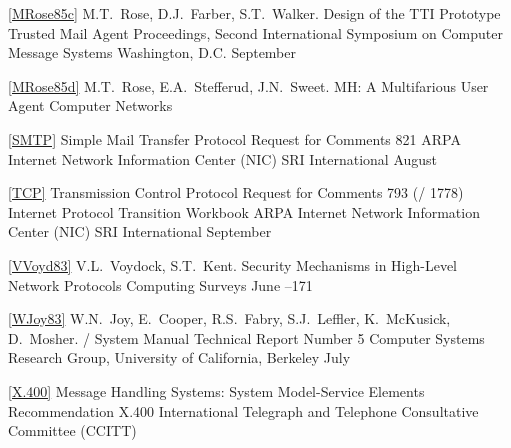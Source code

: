 \ref{MRose85c}
\by M.T.~Rose, D.J.~Farber, S.T.~Walker.
\paper Design of the TTI Prototype Trusted Mail Agent
\inbook Proceedings,
Second International Symposium on Computer Message Systems
\publaddr Washington, D.C.
\month September
\toappear
\endref

\ref{MRose85d}
\by M.T.~Rose, E.A.~Stefferud, J.N.~Sweet.
\paper MH: A Multifarious User Agent
\journal Computer Networks%
\toappear
\endref

\ref{SMTP}
\paper Simple Mail Transfer Protocol
\paperinfo Request for Comments 821
\other
\publ ARPA Internet Network Information Center (NIC)
\publaddr SRI International
\month August
\endref

\ref{TCP}
\paper Transmission Control Protocol
\paperinfo Request for Comments 793 (\milstd/ 1778)
\inbook Internet Protocol Transition Workbook
\publ ARPA Internet Network Information Center (NIC)
\publaddr SRI International
\month September
\endref

\ref{VVoyd83}
\by V.L.~Voydock, S.T.~Kent.
\paper Security Mechanisms in High-Level Network Protocols
\journal Computing Surveys
\month June
--171
\endref

\ref{WJoy83}
\by W.N.~Joy, E.~Cooper, R.S.~Fabry, S.J.~Leffler, K.~McKusick, D.~Mosher.
\bsd/ System Manual
\paperinfo Technical Report Number 5
\publ Computer Systems Research Group, University of California, Berkeley
\month July
\endref

\ref{X.400}
\book Message Handling Systems: System Model-Service Elements
\bookinfo Recommendation X.400
\publ International Telegraph and Telephone Consultative Committee (CCITT)
\endref

\endreferences
